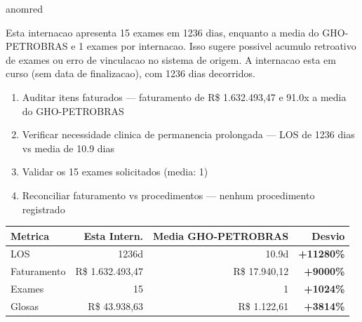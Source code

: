 \documentclass[a4paper,10pt]{article}
\begin{document}
\begin{anomalycard}[Internacao 26105 | GHO-PETROBRAS | CRITICO (z=5.16)]{anomred}
\vspace{2pt}\begin{tcolorbox}[colback=severityred!20,colframe=anomred,title={\textbf{Interpretacao de Negocio}},fonttitle=\bfseries\small,left=4pt,right=4pt,top=3pt,bottom=3pt]
{\small Esta internacao apresenta 15 exames em 1236 dias, enquanto a media do GHO-PETROBRAS e 1 exames por internacao. Isso sugere possivel acumulo retroativo de exames ou erro de vinculacao no sistema de origem. A internacao esta em curso (sem data de finalizacao), com 1236 dias decorridos.}
\end{tcolorbox}
\begin{tcolorbox}[colback=severityyellow!30,colframe=anomorange,title={\textbf{Recomendacoes Especificas}},fonttitle=\bfseries\small,left=4pt,right=4pt,top=3pt,bottom=3pt]
\begin{enumerate}[nosep,leftmargin=16pt]
\item {\small Auditar itens faturados --- faturamento de R\$ 1.632.493,47 e 91.0x a media do GHO-PETROBRAS}
\item {\small Verificar necessidade clinica de permanencia prolongada --- LOS de 1236 dias vs media de 10.9 dias}
\item {\small Validar os 15 exames solicitados (media: 1)}
\item {\small Reconciliar faturamento vs procedimentos --- nenhum procedimento registrado}
\end{enumerate}
\end{tcolorbox}
\begin{center}\begin{tabular}{l r r r}\toprule\textbf{Metrica} & \textbf{Esta Intern.} & \textbf{Media GHO-PETROBRAS} & \textbf{Desvio} \\\midrule
LOS & 1236d & 10.9d & \textcolor{anomred}{\textbf{+11280\%}} \\
Faturamento & R\$ 1.632.493,47 & R\$ 17.940,12 & \textcolor{anomred}{\textbf{+9000\%}} \\
Exames & 15 & 1 & \textcolor{anomred}{\textbf{+1024\%}} \\
Glosas & R\$ 43.938,63 & R\$ 1.122,61 & \textcolor{anomred}{\textbf{+3814\%}} \\
\bottomrule\end{tabular}\end{center}


\end{anomalycard}
\end{document}
